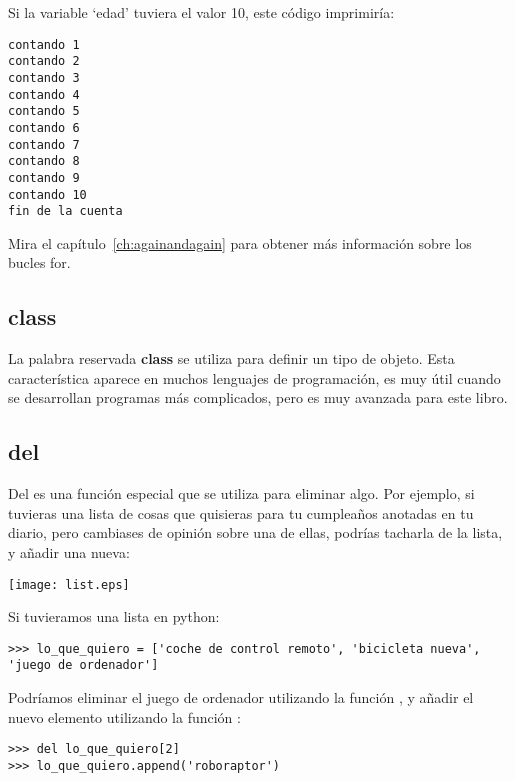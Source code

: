 \noindent
Si la variable `edad' tuviera el valor 10, este código imprimiría:

\begin{listing}
\begin{verbatim}
contando 1
contando 2
contando 3
contando 4
contando 5
contando 6
contando 7
contando 8
contando 9
contando 10
fin de la cuenta
\end{verbatim}
\end{listing}

\noindent
Mira el capítulo~\ref{ch:againandagain} para obtener más información sobre los bucles for.

\subsection*{class}

La palabra reservada \textbf{class} se utiliza para definir un tipo de objeto. Esta característica aparece en muchos lenguajes de programación, es muy útil cuando se desarrollan programas más complicados, pero es muy avanzada para este libro.

\subsection*{del}

Del es una función especial que se utiliza para eliminar algo.  Por ejemplo, si tuvieras una lista de cosas que quisieras para tu cumpleaños anotadas en tu diario, pero cambiases de opinión sobre una de ellas, podrías tacharla de la lista, y añadir una nueva:

\begin{center}
\texttt{[image: list.eps]}
\end{center}

\noindent
Si tuvieramos una lista en python:

\begin{listing}
\begin{verbatim}
>>> lo_que_quiero = ['coche de control remoto', 'bicicleta nueva', 'juego de ordenador']
\end{verbatim}
\end{listing}

\noindent
Podríamos eliminar el juego de ordenador utilizando la función , y añadir el nuevo elemento utilizando la función :

\begin{listing}
\begin{verbatim}
>>> del lo_que_quiero[2]
>>> lo_que_quiero.append('roboraptor')
\end{verbatim}
\end{listing}

